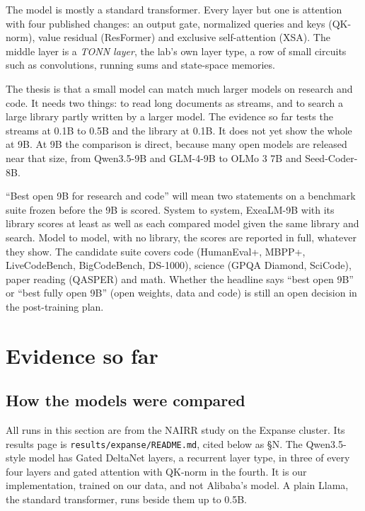 \documentclass[11pt,letterpaper]{article}
\newcommand{\sect}[1]{\S#1}
\begin{document}
The model is mostly a standard transformer.
Every layer but one is attention with four published changes: an output gate, normalized queries and keys (QK-norm), value residual (ResFormer) and exclusive self-attention (XSA).
The middle layer is a \emph{TONN layer}, the lab's own layer type, a row of small circuits such as convolutions, running sums and state-space memories.

The thesis is that a small model can match much larger models on research and code.
It needs two things: to read long documents as streams, and to search a large library partly written by a larger model.
The evidence so far tests the streams at 0.1B to 0.5B and the library at 0.1B.
It does not yet show the whole at 9B.
At 9B the comparison is direct, because many open models are released near that size, from Qwen3.5-9B and GLM-4-9B to OLMo 3 7B and Seed-Coder-8B.

``Best open 9B for research and code'' will mean two statements on a benchmark suite frozen before the 9B is scored.
System to system, ExeaLM-9B with its library scores at least as well as each compared model given the same library and search.
Model to model, with no library, the scores are reported in full, whatever they show.
The candidate suite covers code (HumanEval+, MBPP+, LiveCodeBench, BigCodeBench, DS-1000), science (GPQA Diamond, SciCode), paper reading (QASPER) and math.
Whether the headline says ``best open 9B'' or ``best fully open 9B'' (open weights, data and code) is still an open decision in the post-training plan.

\section{Evidence so far}

\subsection{How the models were compared}

All runs in this section are from the NAIRR study on the Expanse cluster. Its results page is \texttt{results/}\allowbreak\texttt{expanse/README.md}, cited below as \sect{N}.
The Qwen3.5-style model has Gated DeltaNet layers, a recurrent layer type, in three of every four layers and gated attention with QK-norm in the fourth.
It is our implementation, trained on our data, and not Alibaba's model.
A plain Llama, the standard transformer, runs beside them up to 0.5B.
\end{document}
